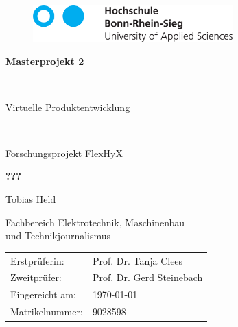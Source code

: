 \begin{titlepage}
	\begin{figure}[htbp]
		\includegraphics[height=1.4cm]{Kapitel/xx_Logo_HBRS_74mm_Pfade-eps-converted-to.pdf}
	\end{figure}
  \linespread{1.4}%
  \vspace{2cm}
  \begin{center}

    \begin{Huge}\textbf{Masterprojekt 2}\end{Huge} \\
    \vspace{1cm}
    \begin{Large}{Virtuelle Produktentwicklung}\end{Large} \\
    \begin{large}
    	Forschungsprojekt FlexHyX
    \end{large}

    \vspace{0.7cm}
    \linespread{1.2}%
    \begin{huge}
      \textbf{???\\}
    \end{huge}
    \linespread{1.5}%
    \normalsize
    \vspace{1cm}%

    \begin{Large}{Tobias Held \\}
    \end{Large}

    \begin{Large}%
        Fachbereich Elektrotechnik, Maschinenbau \\ und Technikjournalismus
    \end{Large}
  \end{center}

  \vfill

  \begin{large}
    {
      \begin{tabular}{ll}
      Erstprüferin:  & Prof. Dr. Tanja Clees \\
      Zweitprüfer: & Prof. Dr. Gerd Steinebach \\
      Eingereicht am: & \today \\%
      Matrikelnummer: & 9028598
      \end{tabular}
	}
  \end{large}

\end{titlepage}
